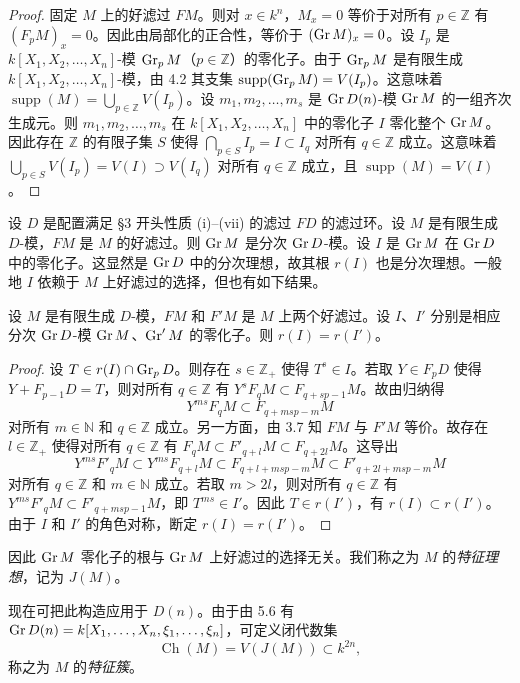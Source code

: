 \begin{proof}
固定 $M$ 上的好滤过 $F M$。则对 $x\in k^n$，$M_x=0$ 等价于对所有 $p\in\mathbb{Z}$ 有 $(F_p M)_x=0$。因此由局部化的正合性，等价于 $(\operatorname{Gr} M)_x=0$。设 $I_p$ 是 $k[X_1,X_2,\dots,X_n]$-模 $\operatorname{Gr}_p M$（$p\in\mathbb{Z}$）的零化子。由于 $\operatorname{Gr}_p M$ 是有限生成 $k[X_1,X_2,\dots,X_n]$-模，由 4.2 其支集 $\operatorname{supp}(\operatorname{Gr}_p M)=V(I_p)$。这意味着 $\operatorname{supp}(M)=\bigcup_{p\in\mathbb{Z}}V(I_p)$。设 $m_1,m_2,\dots,m_s$ 是 $\operatorname{Gr} D(n)$-模 $\operatorname{Gr} M$ 的一组齐次生成元。则 $m_1,m_2,\dots,m_s$ 在 $k[X_1,X_2,\dots,X_n]$ 中的零化子 $I$ 零化整个 $\operatorname{Gr} M$。因此存在 $\mathbb{Z}$ 的有限子集 $S$ 使得 $\bigcap_{p\in S}I_p=I\subset I_q$ 对所有 $q\in\mathbb{Z}$ 成立。这意味着 $\bigcup_{p\in S}V(I_p)=V(I)\supset V(I_q)$ 对所有 $q\in\mathbb{Z}$ 成立，且 $\operatorname{supp}(M)=V(I)$。
\end{proof}

设 $D$ 是配置满足 §3 开头性质 (i)--(vii) 的滤过 $F D$ 的滤过环。设 $M$ 是有限生成 $D$-模，$F M$ 是 $M$ 的好滤过。则 $\operatorname{Gr} M$ 是分次 $\operatorname{Gr} D$-模。设 $I$ 是 $\operatorname{Gr} M$ 在 $\operatorname{Gr} D$ 中的零化子。这显然是 $\operatorname{Gr} D$ 中的分次理想，故其根 $r(I)$ 也是分次理想。一般地 $I$ 依赖于 $M$ 上好滤过的选择，但也有如下结果。

\begin{lemma}
设 $M$ 是有限生成 $D$-模，$F M$ 和 $F'M$ 是 $M$ 上两个好滤过。设 $I$、$I'$ 分别是相应分次 $\operatorname{Gr} D$-模 $\operatorname{Gr} M$、$\operatorname{Gr}' M$ 的零化子。则 $r(I)=r(I')$。
\end{lemma}

\begin{proof}
设 $T\in r(I)\cap\operatorname{Gr}_p D$。则存在 $s\in\mathbb{Z}_+$ 使得 $T^s\in I$。若取 $Y\in F_p D$ 使得 $Y+F_{p-1}D=T$，则对所有 $q\in\mathbb{Z}$ 有 $Y^s F_q M\subset F_{q+sp-1}M$。故由归纳得
$$Y^{ms}F_q M\subset F_{q+msp-m}M$$
对所有 $m\in\mathbb{N}$ 和 $q\in\mathbb{Z}$ 成立。另一方面，由 3.7 知 $F M$ 与 $F'M$ 等价。故存在 $l\in\mathbb{Z}_+$ 使得对所有 $q\in\mathbb{Z}$ 有 $F_q M\subset F'_{q+l}M\subset F_{q+2l}M$。这导出
$$Y^{ms}F'_q M\subset Y^{ms}F_{q+l}M\subset F_{q+l+msp-m}M\subset F'_{q+2l+msp-m}M$$
对所有 $q\in\mathbb{Z}$ 和 $m\in\mathbb{N}$ 成立。若取 $m>2l$，则对所有 $q\in\mathbb{Z}$ 有 $Y^{ms}F'_q M\subset F'_{q+msp-1}M$，即 $T^{ms}\in I'$。因此 $T\in r(I')$，有 $r(I)\subset r(I')$。由于 $I$ 和 $I'$ 的角色对称，断定 $r(I)=r(I')$。
\end{proof}

因此 $\operatorname{Gr} M$ 零化子的根与 $\operatorname{Gr} M$ 上好滤过的选择无关。我们称之为 $M$ 的\emph{特征理想}，记为 $J(M)$。

现在可把此构造应用于 $D(n)$。由于由 5.6 有 $\operatorname{Gr} D(n)=k[X_1,\dots,X_n,\xi_1,\dots,\xi_n]$，可定义闭代数集
$$\operatorname{Ch}(M)=V(J(M))\subset k^{2n},$$
称之为 $M$ 的\emph{特征簇}。

